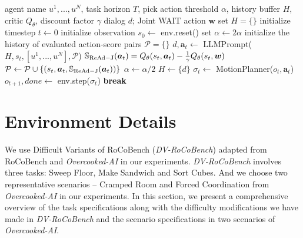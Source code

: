 \documentclass[11pt]{article}
\theoremstyle{plain}
\theoremstyle{remark}
\begin{document}
\begin{algorithm}[h!]
   \caption{\emph{ReAd-J}: Reinforced Advantage Feedback with Joint Plan Refinement}
   \label{alg:llm_planning_joint}
\begin{algorithmic}
    agent name $u^1, ..., u^N$, task horizon $T$, pick action threshold $\alpha$, history buffer $H$, critic $Q_\theta$, discount factor $\gamma$
    dialog $d$; Joint WAIT action $\boldsymbol{w}$
   \STATE set $H = \{\}$
   \STATE initialize timestep $t \leftarrow 0$
   \STATE initialize observation $s_0 \leftarrow$ env$.$reset()
   \STATE set $\alpha \leftarrow 2\alpha$
   {\color{violet}
   \STATE initialize the history of evaluated action-score pairs $\mathcal{P} = \{\}$
   \REPEAT
   \STATE $d, \boldsymbol{a}_t \leftarrow$ LLMPrompt($H, s_t, [u^1, ..., u^N], \mathcal{P}$)
   \STATE $\mathbb{S}_{\rm ReAd-J}(\boldsymbol{a}_t) = Q_\theta(s_t, \boldsymbol{a}_t) - \frac{1}{\gamma} Q_\theta(s_t, \boldsymbol{w})$
   \STATE $\mathcal{P} \leftarrow \mathcal{P} \cup \{(s_t, \boldsymbol{a}_t, \mathbb{S}_{\rm ReAd-J}(\boldsymbol{a}_t) )\}$
   \STATE $\alpha \leftarrow  \alpha / 2$
   }
   \STATE $H \leftarrow \{d\}$
   \STATE $\sigma_t \leftarrow$ MotionPlanner($o_t, \boldsymbol{a}_t$)
   \STATE $o_{t+1}, done \leftarrow$ env$.$step($\sigma_t$)
   \STATE \bfseries break
   \ENDIF
   \ENDWHILE
\end{algorithmic}
\end{algorithm}


\newpage 
\section{Environment Details}
\label{env-detail}

We use Difficult Variants of RoCoBench (\emph{DV-RoCoBench}) adapted from RoCoBench \citep{mandi2023roco} and \emph{Overcooked-AI} \citep{micah2019overcooked_ai} in our experiments. \emph{DV-RoCoBench} involves three tasks: Sweep Floor, Make Sandwich and Sort Cubes. And we choose two representative scenarios -- Cramped Room and Forced Coordination from \emph{Overcooked-AI} in our experiments. In this section, we present a comprehensive overview of the task specifications along with the difficulty modifications we have made in \emph{DV-RoCoBench} and the scenario specifications in two scenarios of \emph{Overcooked-AI}.
\end{document}
